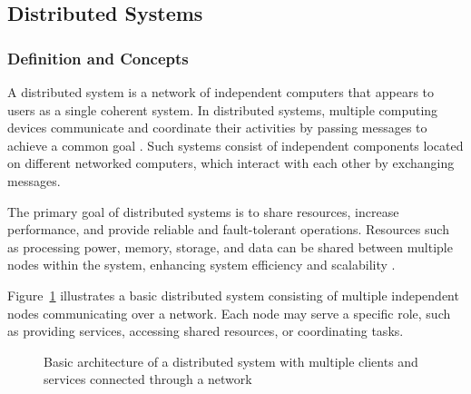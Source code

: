\subsection{Distributed Systems}

\subsubsection{Definition and Concepts}

A distributed system is a network of independent computers that appears to users as a single coherent system. In distributed systems, multiple computing devices communicate and coordinate their activities by passing messages to achieve a common goal \cite{tanenbaum2017}. Such systems consist of independent components located on different networked computers, which interact with each other by exchanging messages.

\vspace{1em}
The primary goal of distributed systems is to share resources, increase performance, and provide reliable and fault-tolerant operations. Resources such as processing power, memory, storage, and data can be shared between multiple nodes within the system, enhancing system efficiency and scalability \cite{coulouris2012}.

\vspace{1em}
Figure~\ref{fig:distributed_architecture} illustrates a basic distributed system consisting of multiple independent nodes communicating over a network. Each node may serve a specific role, such as providing services, accessing shared resources, or coordinating tasks.

\begin{figure}[H]
	\centering
	\caption{Basic architecture of a distributed system with multiple clients and services connected through a network}
	\label{fig:distributed_architecture}
\end{figure}


